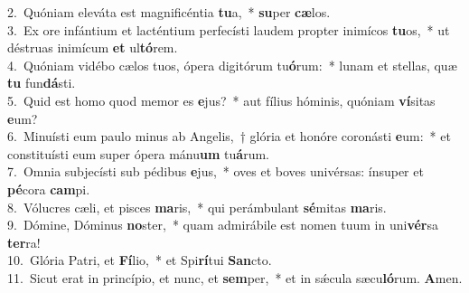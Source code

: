 {2.~}Quóniam eleváta est magnificéntia \textbf{tu}a,~* \textbf{su}per \textbf{cæ}los.\\
{3.~}Ex ore infántium et lacténtium perfecísti laudem propter inimícos \textbf{tu}os,~* ut déstruas inimícum \textbf{et} ul\textbf{tó}rem.\\
{4.~}Quóniam vidébo cælos tuos, ópera digitórum tu\textbf{ó}rum:~* lunam et stellas, quæ \textbf{tu} fun\textbf{dá}sti.\\
{5.~}Quid est homo quod memor es \textbf{e}jus?~* aut fílius hóminis, quóniam \textbf{ví}sitas \textbf{e}um?\\
{6.~}Minuísti eum paulo minus ab Angelis,~† glória et honóre coronásti \textbf{e}um:~* et constituísti eum super ópera mánu\textbf{um} tu\textbf{á}rum.\\
{7.~}Omnia subjecísti sub pédibus \textbf{e}jus,~* oves et boves univérsas: ínsuper et \textbf{pé}cora \textbf{cam}pi.\\
{8.~}Vólucres cæli, et pisces \textbf{ma}ris,~* qui perámbulant \textbf{sé}mitas \textbf{ma}ris.\\
{9.~}Dómine, Dóminus \textbf{no}ster,~* quam admirábile est nomen tuum in uni\textbf{vér}sa \textbf{ter}ra!\\
{10.~}Glória Patri, et \textbf{Fí}lio,~* et Spi\textbf{rí}tui \textbf{San}cto.\\
{11.~}Sicut erat in princípio, et nunc, et \textbf{sem}per,~* et in sǽcula sæcu\textbf{ló}rum. \textbf{A}men.\\

